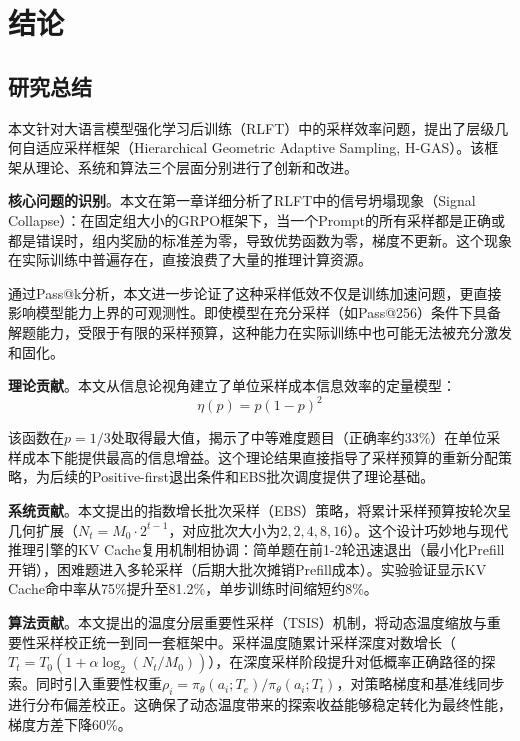 \chapter{结论}
\label{chap:conclusion}

\section{研究总结}
\label{sec:summary}

本文针对大语言模型强化学习后训练（RLFT）中的采样效率问题，提出了层级几何自适应采样框架（Hierarchical Geometric Adaptive Sampling, H-GAS）。该框架从理论、系统和算法三个层面分别进行了创新和改进。

\textbf{核心问题的识别}。本文在第一章详细分析了RLFT中的信号坍塌现象（Signal Collapse）：在固定组大小的GRPO框架下，当一个Prompt的所有采样都是正确或都是错误时，组内奖励的标准差为零，导致优势函数为零，梯度不更新。这个现象在实际训练中普遍存在，直接浪费了大量的推理计算资源。

通过Pass@k分析，本文进一步论证了这种采样低效不仅是训练加速问题，更直接影响模型能力上界的可观测性。即使模型在充分采样（如Pass@256）条件下具备解题能力，受限于有限的采样预算，这种能力在实际训练中也可能无法被充分激发和固化。

\textbf{理论贡献}。本文从信息论视角建立了单位采样成本信息效率的定量模型：
\begin{equation}
\eta(p) = p(1-p)^2
\end{equation}

该函数在$p = 1/3$处取得最大值，揭示了中等难度题目（正确率约33\%）在单位采样成本下能提供最高的信息增益。这个理论结果直接指导了采样预算的重新分配策略，为后续的Positive-first退出条件和EBS批次调度提供了理论基础。

\textbf{系统贡献}。本文提出的指数增长批次采样（EBS）策略，将累计采样预算按轮次呈几何扩展（$N_t = M_0 \cdot 2^{t-1}$，对应批次大小为$2, 2, 4, 8, 16$）。这个设计巧妙地与现代推理引擎的KV Cache复用机制相协调：简单题在前1-2轮迅速退出（最小化Prefill开销），困难题进入多轮采样（后期大批次摊销Prefill成本）。实验验证显示KV Cache命中率从75\%提升至81.2\%，单步训练时间缩短约8\%。

\textbf{算法贡献}。本文提出的温度分层重要性采样（TSIS）机制，将动态温度缩放与重要性采样校正统一到同一套框架中。采样温度随累计采样深度对数增长（$T_t = T_0(1 + \alpha \log_2(N_t / M_0))$），在深度采样阶段提升对低概率正确路径的探索。同时引入重要性权重$\rho_i = \pi_\theta(a_i; T_e) / \pi_\theta(a_i; T_t)$，对策略梯度和基准线同步进行分布偏差校正。这确保了动态温度带来的探索收益能够稳定转化为最终性能，梯度方差下降60\%。

